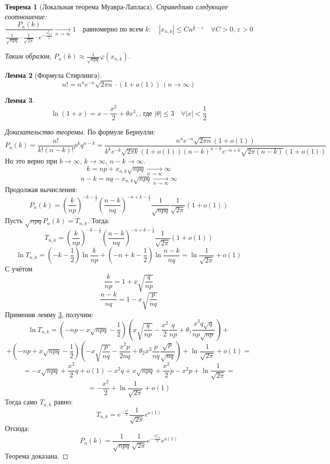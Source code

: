 \documentclass[11pt,openany,a4paper]{scrartcl}
\theoremstyle{plain}
\newtheorem{theorem}{Теорема}[subsection]
\newtheorem{lemma}[theorem]{Лемма}
\theoremstyle{definition}
\newcommand{\underto}[1]{\xrightarrow[#1]{}}
\begin{document}
\begin{theorem}[Локальная теорема Муавра-Лапласа]
    Справедливо следующее соотношение:
    $$
    \frac{P_n(k)}{\frac{1}{\sqrt{npq}}\cdot \frac{1}{\sqrt{2\pi}}\cdot
    e^{-\frac{x_{n,k}^2}{2}}} \underto{n \to \infty} 1\quad \text{равномерно по всем } k:\quad
    |x_{n,k}|\leqslant Cn^{\frac{1}{6}-\varepsilon}\quad \forall C>0,\, \varepsilon > 0
    $$
    
    Таким образом, $P_n(k) \approx \frac{1}{\sqrt{npq}}\varphi(x_{n,k})$.
\end{theorem}
\begin{lemma}[Формула Стирлинга]
    $$
    n! = n^n e^{-n} \sqrt{2\pi n}\cdot(1 + o(1))\, (n \to \infty)
    $$
\end{lemma}
\begin{lemma}\label{laplacetheoremlemma2}
    $$
    \ln(1+x) = x - \frac{x^2}{2} + \theta x^3,\text{, где } |\theta| \leqslant 3
    \quad\forall |x| < \frac{1}{2}
    $$
\end{lemma}
\begin{proof}[Доказательство теоремы]
    По формуле Бернулли:
    $$
    P_n(k) = \frac{n!}{k!(n-k)!}p^k q^{n-k} =
    \frac{n^n e^{-n}\sqrt{2\pi n} (1 + o(1))}{k^k e^{-k} \sqrt{2\pi k} (1 + o(1))
    (n-k)^{n-k} e^{-n+k}\sqrt{2\pi (n-k)}(1 + o(1))}
    $$
    Но это верно при $b \to \infty$, $k \to \infty$, $n-k \to \infty$.
    $$
    k = np + x_{n,k}\sqrt{npq} \underto{n \to \infty} \infty
    $$
    $$
    n-k = nq - x_{n,k}\sqrt{npq} \underto{n \to \infty} \infty
    $$
    Продолжая вычисления:
    $$
    P_n(k) = (\frac{k}{np})^{-k-\frac{1}{2}}(\frac{n-k}{nq})^{-n+k-\frac{1}{2}}
    \frac{1}{\sqrt{npq}}\frac{1}{\sqrt{2\pi}}(1 + o(1))
    $$
    Пусть $\sqrt{npq}P_n(k) = T_{n,k}$. Тогда:
    $$
    T_{n,k} = (\frac{k}{np})^{-k-\frac{1}{2}}(\frac{n-k}{nq})^{-n+k-\frac{1}{2}}
    \frac{1}{\sqrt{2\pi}}(1 + o(1))
    $$
    $$
    \ln T_{n,k} = (-k - \frac{1}{2})\ln \frac{k}{np} + (-n+k-\frac{1}{2})
    \ln \frac{n-k}{nq} = \ln \frac{1}{\sqrt{2\pi}} + o(1)
    $$
    С учётом
    $$
    \frac{k}{np} = 1 + x\sqrt{\frac{q}{np}}
    $$
    $$
    \frac{n-k}{nq} = 1 - x\sqrt{\frac{p}{nq}}
    $$
    Применив лемму \ref{laplacetheoremlemma2}, получим:
    $$
    \ln T_{n,k} = (-np - x\sqrt{npq} - \frac{1}{2})(x\sqrt{\frac{q}{np}} -
    \frac{x^2}{2}\frac{q}{np} + \theta_1 \frac{x^3 q\sqrt{q}}{np\sqrt{np}}) +
    $$
    $$
    + (-np + x\sqrt{npq} - \frac{1}{2})(-x\sqrt{\frac{p}{nq}} -
    \frac{x^2p}{2nq} + \theta_2x^3\frac{p}{nq}\frac{\sqrt{p}}{\sqrt{nq}}) +
    \ln \frac{1}{\sqrt{2\pi}} + o(1) =
    $$
    $$
    = -x\sqrt{npq} + \frac{x^2}{2}q + o(1) - x^2q + x\sqrt{npq} + \frac{x^2}{2}p
    - x^2p + \ln \frac{1}{\sqrt{2\pi}} =
    $$
    $$
    =-\frac{x^2}{2} + \ln \frac{1}{\sqrt{2\pi}} + o(1) 
    $$
    Тогда само $T_{n,k}$ равно:
    $$
    T_{n,k} = e^{-\frac{x^2}{2}} \frac{1}{\sqrt{2\pi}} e^{o(1)}
    $$
    Отсюда:
    $$
    P_n(k) = \frac{1}{\sqrt{npq}}\frac{1}{\sqrt{2\pi}}e^{-\frac{x^2_{n,k}}{2}}
    e^{o(1)}
    $$
    Теорема доказана.
\end{proof}
\end{document}
